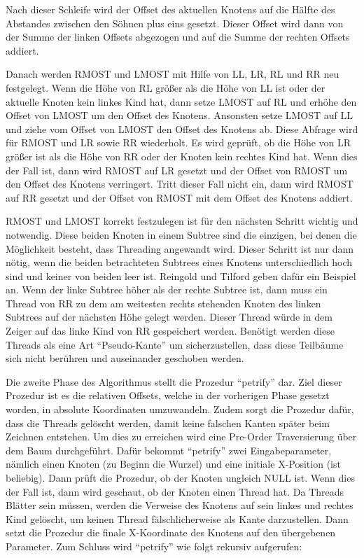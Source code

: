 Nach dieser Schleife wird der Offset des aktuellen Knotens auf die Hälfte des Abstandes zwischen den Söhnen plus eins gesetzt. 
Dieser Offset wird dann von der Summe der linken Offsets abgezogen und auf die Summe der rechten Offsets addiert. 

Danach werden RMOST und LMOST mit Hilfe von LL, LR, RL und RR neu festgelegt. Wenn die Höhe von RL größer als die Höhe von LL ist oder 
der aktuelle Knoten kein linkes Kind hat, dann setze LMOST auf RL und erhöhe den Offset von LMOST um den Offset des Knotens. 
Ansonsten setze LMOST auf LL und ziehe vom Offset von LMOST den Offset des Knotens ab. Diese Abfrage wird für RMOST und LR sowie RR 
wiederholt. Es wird geprüft, ob die Höhe von LR größer ist als die Höhe von RR oder der Knoten kein rechtes Kind hat. Wenn dies der Fall ist, 
dann wird RMOST auf LR gesetzt und der Offset von RMOST um den Offset des Knotens verringert. Tritt dieser Fall nicht ein, dann wird RMOST 
auf RR gesetzt und der Offset von RMOST mit dem Offset des Knotens addiert. 

RMOST und LMOST korrekt festzulegen ist für den nächsten Schritt wichtig und notwendig. Diese beiden Knoten in einem Subtree 
sind die einzigen, bei denen die Möglichkeit besteht, dass Threading angewandt wird. Dieser Schritt ist nur dann nötig, wenn 
die beiden betrachteten Subtrees eines Knotens unterschiedlich hoch sind und keiner von beiden leer ist. Reingold und Tilford 
geben dafür ein Beispiel an. Wenn der linke Subtree höher als der rechte Subtree ist, dann muss ein Thread von RR zu dem am weitesten 
rechts stehenden Knoten des linken Subtrees auf der nächsten Höhe gelegt werden. Dieser Thread würde in dem Zeiger auf das linke Kind 
von RR gespeichert werden. Benötigt werden diese Threads als eine Art “Pseudo-Kante” um sicherzustellen, dass diese Teilbäume sich 
nicht berühren und auseinander geschoben werden.

Die zweite Phase des Algorithmus stellt die Prozedur “petrify” dar. Ziel dieser Prozedur ist es die relativen Offsets, 
welche in der vorherigen Phase gesetzt worden, in absolute Koordinaten umzuwandeln. Zudem sorgt die Prozedur dafür, dass die Threads 
gelöscht werden, damit keine falschen Kanten später beim Zeichnen entstehen. Um dies zu erreichen wird eine Pre-Order Traversierung 
über dem Baum durchgeführt. Dafür bekommt “petrify” zwei Eingabeparameter, nämlich einen Knoten (zu Beginn die Wurzel) und eine 
initiale X-Position (ist beliebig). Dann prüft die Prozedur, ob der Knoten ungleich NULL ist. Wenn dies der Fall ist, dann wird geschaut, 
ob der Knoten einen Thread hat. Da Threads Blätter sein müssen, werden die Verweise des Knotens auf sein linkes und rechtes Kind gelöscht, 
um keinen Thread fälschlicherweise als Kante darzustellen. Dann setzt die Prozedur die finale X-Koordinate des Knotens auf den 
übergebenen Parameter. Zum Schluss wird “petrify” wie folgt rekursiv aufgerufen:

